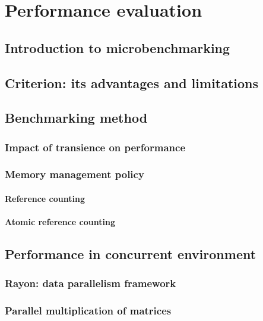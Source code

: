 \chapter{Performance evaluation}
\section{Introduction to microbenchmarking}
\section{Criterion: its advantages and limitations}
\section{Benchmarking method}
\subsection{Impact of transience on performance}
\subsection{Memory management policy}
\subsubsection{Reference counting}
\subsubsection{Atomic reference counting}
\section{Performance in concurrent environment}
\subsection{Rayon: data parallelism framework}
\subsection{Parallel multiplication of matrices}